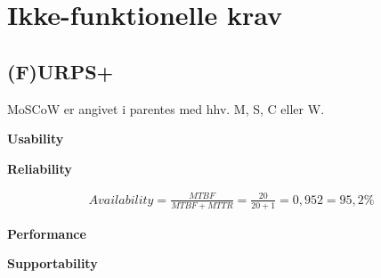 \section{Ikke-funktionelle krav}


\subsection{(F)URPS+}
MoSCoW er angivet i parentes med hhv. M, S, C eller W.

\textbf{Usability}


\textbf{Reliability}

				\begin{align}
					Availability = \frac{MTBF}{MTBF+MTTR} = \frac{20}{20+1} = 0,952 = 95,2 \%
				\end{align}



\textbf{Performance}

\textbf{Supportability}
















